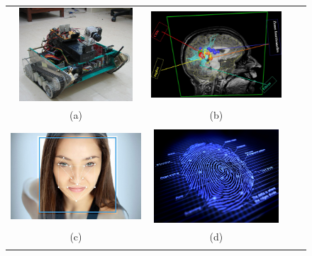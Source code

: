 \begin{figure}[h]
\centering

\begin{tabular}{cccc}

\includegraphics[width=5.5cm, height=3.5cm]{Figures/chap1/VisionArtificielle1.jpg}
&
\includegraphics[width=5.5cm, height=3.5cm]{Figures/chap1/ImagerieMedical.jpeg}\\
(a) & (b)\\\\

\includegraphics[width=5.5cm, height=3.5cm]{Figures/chap1/reconaissanceFacial.jpg}
&
\includegraphics[width=5.5cm, height=3.5cm]{Figures/chap1/empreinteDigitale.jpeg}\\
(c) & (d)\\\\


\end{tabular}
\end{figure}
